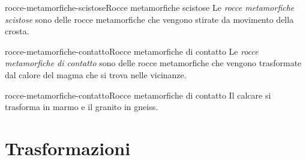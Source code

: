 \documentclass[preview]{standalone}
\begin{document}
\begin{snippetdefinition}{rocce-metamorfiche-scistose}{Rocce metamorfiche scistose}
    Le \textit{rocce metamorfiche scistose} sono delle rocce metamorfiche
    che vengono stirate da movimento della crosta.
\end{snippetdefinition}

\begin{snippetdefinition}{rocce-metamorfiche-contatto}{Rocce metamorfiche di contatto}
    Le \textit{rocce metamorfiche di contatto} sono delle rocce metamorfiche
    che vengono trasformate dal calore del magma che si trova nelle vicinanze.
\end{snippetdefinition}

\begin{snippetexample}{rocce-metamorfiche-contatto}{Rocce metamorfiche di contatto}
    Il calcare si trasforma in marmo e il granito in gneiss.
\end{snippetexample}

\section{Trasformazioni}


\end{document}
